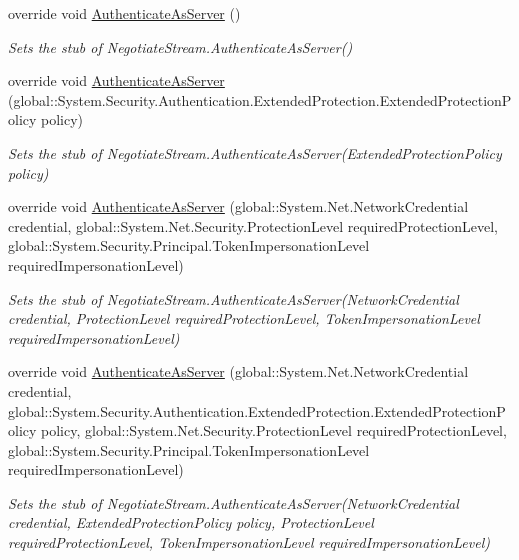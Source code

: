 \begin{DoxyCompactItemize}
override void \hyperlink{class_system_1_1_net_1_1_security_1_1_fakes_1_1_stub_negotiate_stream_a26bff9d4725557fa4a5741f3d0fec7d8}{Authenticate\-As\-Server} ()
\begin{DoxyCompactList}\small\item\em Sets the stub of Negotiate\-Stream.\-Authenticate\-As\-Server()\end{DoxyCompactList}\item 
override void \hyperlink{class_system_1_1_net_1_1_security_1_1_fakes_1_1_stub_negotiate_stream_a3fd18b0824abf9f59d0e096dd1e4047a}{Authenticate\-As\-Server} (global\-::\-System.\-Security.\-Authentication.\-Extended\-Protection.\-Extended\-Protection\-Policy policy)
\begin{DoxyCompactList}\small\item\em Sets the stub of Negotiate\-Stream.\-Authenticate\-As\-Server(\-Extended\-Protection\-Policy policy)\end{DoxyCompactList}\item 
override void \hyperlink{class_system_1_1_net_1_1_security_1_1_fakes_1_1_stub_negotiate_stream_a2ec32c675a3af90198aa6fe86a229892}{Authenticate\-As\-Server} (global\-::\-System.\-Net.\-Network\-Credential credential, global\-::\-System.\-Net.\-Security.\-Protection\-Level required\-Protection\-Level, global\-::\-System.\-Security.\-Principal.\-Token\-Impersonation\-Level required\-Impersonation\-Level)
\begin{DoxyCompactList}\small\item\em Sets the stub of Negotiate\-Stream.\-Authenticate\-As\-Server(\-Network\-Credential credential, Protection\-Level required\-Protection\-Level, Token\-Impersonation\-Level required\-Impersonation\-Level)\end{DoxyCompactList}\item 
override void \hyperlink{class_system_1_1_net_1_1_security_1_1_fakes_1_1_stub_negotiate_stream_aa8b786d8fed7a9377c1bc4bed8de5445}{Authenticate\-As\-Server} (global\-::\-System.\-Net.\-Network\-Credential credential, global\-::\-System.\-Security.\-Authentication.\-Extended\-Protection.\-Extended\-Protection\-Policy policy, global\-::\-System.\-Net.\-Security.\-Protection\-Level required\-Protection\-Level, global\-::\-System.\-Security.\-Principal.\-Token\-Impersonation\-Level required\-Impersonation\-Level)
\begin{DoxyCompactList}\small\item\em Sets the stub of Negotiate\-Stream.\-Authenticate\-As\-Server(\-Network\-Credential credential, Extended\-Protection\-Policy policy, Protection\-Level required\-Protection\-Level, Token\-Impersonation\-Level required\-Impersonation\-Level)\end{DoxyCompactList}\item 

\end{DoxyCompactItemize}
